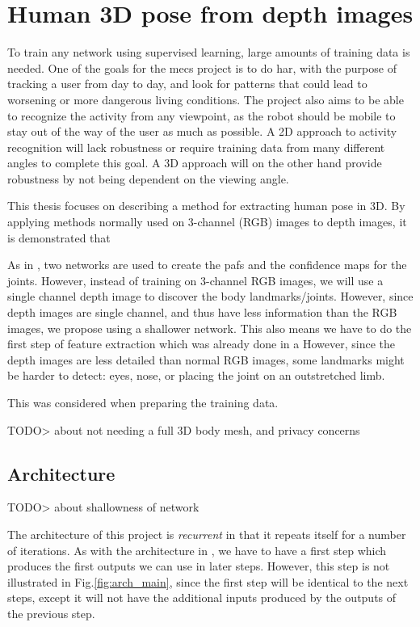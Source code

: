\chapter{Human 3D pose from depth images}

To train any network using supervised learning, large amounts of training data is needed. One of the goals for the \gls{mecs} project is to do \gls{har}, with the purpose of tracking a user from day to day, and look for patterns that could lead to worsening or more dangerous living conditions. The project also aims to be able to recognize the activity from any viewpoint, as the robot should be mobile to stay out of the way of the user as much as possible. A 2D approach to activity recognition will lack robustness or require training data from many different angles to complete this goal. A 3D approach will on the other hand provide robustness by not being dependent on the viewing angle.

This thesis focuses on describing a method for extracting human pose in 3D. By applying methods normally used on 3-channel (RGB) images to depth images, it is demonstrated that 

As in \cite{cao2017realtime}, two networks are used to create the \gls{paf}s and the confidence maps for the joints. However, instead of training on 3-channel RGB images, we will use a single channel depth image to discover the body landmarks/joints.
However, since depth images are single channel, and thus have less information than the RGB images, we propose using a shallower network. This also means we have to do the first step of feature extraction which was already done in a
However, since the depth images are less detailed than normal RGB images, some landmarks might be harder to detect: eyes, nose, or placing the joint on an outstretched limb.

This was considered when preparing the training data.

TODO> about not needing a full 3D body mesh, and privacy concerns

\section{Architecture}

TODO> about shallowness of network

The architecture of this project is \emph{recurrent} in that it repeats itself for a number of iterations. As with the architecture in \cite{cao2017realtime}, we have to have a first step which produces the first outputs we can use in later steps. However, this step is not illustrated in Fig.\ref{fig:arch_main}, since the first step will be identical to the next steps, except it will not have the additional inputs produced by the outputs of the previous step.

